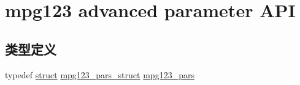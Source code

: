 \hypertarget{group__mpg123__advpar}{}\section{mpg123 advanced parameter A\+PI}
\label{group__mpg123__advpar}
\subsection*{类型定义}
\begin{DoxyCompactItemize}
\item 
typedef \hyperlink{interfacestruct}{struct} \hyperlink{structmpg123__pars__struct}{mpg123\+\_\+pars\+\_\+struct} \hyperlink{group__mpg123__advpar_ga3983578625af3bb6dc7e3b74d0cab4aa}{mpg123\+\_\+pars}
\end{DoxyCompactItemize}
